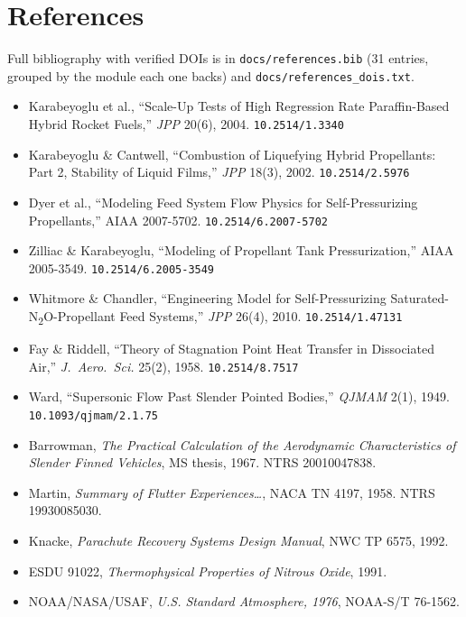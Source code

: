 \documentclass[11pt,a4paper]{article}
\begin{document}
\section{References}

Full bibliography with verified DOIs is in \texttt{docs/references.bib} (31
entries, grouped by the module each one backs) and
\texttt{docs/references\_dois.txt}.

\begin{itemize}[leftmargin=*,itemsep=1pt]
\item Karabeyoglu et al., ``Scale-Up Tests of High Regression Rate
      Paraffin-Based Hybrid Rocket Fuels,'' \emph{JPP} 20(6), 2004.
      \texttt{10.2514/1.3340}
\item Karabeyoglu \& Cantwell, ``Combustion of Liquefying Hybrid Propellants:
      Part 2, Stability of Liquid Films,'' \emph{JPP} 18(3), 2002.
      \texttt{10.2514/2.5976}
\item Dyer et al., ``Modeling Feed System Flow Physics for Self-Pressurizing
      Propellants,'' AIAA 2007-5702. \texttt{10.2514/6.2007-5702}
\item Zilliac \& Karabeyoglu, ``Modeling of Propellant Tank Pressurization,''
      AIAA 2005-3549. \texttt{10.2514/6.2005-3549}
\item Whitmore \& Chandler, ``Engineering Model for Self-Pressurizing
      Saturated-N\textsubscript{2}O-Propellant Feed Systems,'' \emph{JPP} 26(4),
      2010. \texttt{10.2514/1.47131}
\item Fay \& Riddell, ``Theory of Stagnation Point Heat Transfer in Dissociated
      Air,'' \emph{J.\ Aero.\ Sci.} 25(2), 1958. \texttt{10.2514/8.7517}
\item Ward, ``Supersonic Flow Past Slender Pointed Bodies,'' \emph{QJMAM} 2(1),
      1949. \texttt{10.1093/qjmam/2.1.75}
\item Barrowman, \emph{The Practical Calculation of the Aerodynamic
      Characteristics of Slender Finned Vehicles}, MS thesis, 1967.
      NTRS 20010047838.
\item Martin, \emph{Summary of Flutter Experiences\ldots}, NACA TN 4197, 1958.
      NTRS 19930085030.
\item Knacke, \emph{Parachute Recovery Systems Design Manual}, NWC TP 6575, 1992.
\item ESDU 91022, \emph{Thermophysical Properties of Nitrous Oxide}, 1991.
\item NOAA/NASA/USAF, \emph{U.S. Standard Atmosphere, 1976}, NOAA-S/T 76-1562.
\end{itemize}
\end{document}
